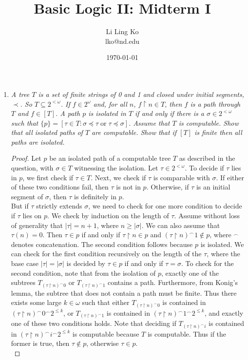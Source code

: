 \documentclass{article}
\begin{document}
\title{Basic Logic II: Midterm I}
\author{Li Ling Ko\\ lko@nd.edu}
\date{\today}
\maketitle

\begin{enumerate}[label={\bf Q\arabic*:}]
  \item \it A tree $T$ is a set of finite strings of 0 and 1 and closed
    under initial segments, $\prec$. So $T\subseteq2^{<\omega}$. If
    $f\in2^\omega$ and, for all $n$, $f\restriction n\in T$, then $f$ is a
    path through $T$ and $f\in[T]$. A path $p$ is isolated in $T$ if and
    only if there is a $\sigma\in2^{<\omega}$ such that $\{p\}=[\tau\in
    T:\sigma\preceq\tau\; \text{or}\; \tau\preceq\sigma]$. Assume that $T$
    is computable. Show that all isolated paths of $T$ are computable. Show
    that if $[T]$ is finite then all paths are isolated.

    \begin{proof}
      Let $p$ be an isolated path of a computable tree $T$ as described in
      the question, with $\sigma\in T$ witnessing the isolation. Let
      $\tau\in2^{<\omega}$. To decide if $\tau$ lies in $p$, we first check
      if $\tau\in T$. Next, we check if $\tau$ is comparable with
      $\sigma$. If either of these two conditions fail, then $\tau$ is not
      in $p$. Otherwise, if $\tau$ is an initial segment of $\sigma$, then
      $\tau$ is definitely in $p$. \\

      But if $\tau$ strictly extends $\sigma$, we need to check for one
      more condition to decide if $\tau$ lies on $p$. We check by induction
      on the length of $\tau$. Assume without loss of generality that
      $|\tau|=n+1$, where $n\geq|\sigma|$. We can also assume that
      $\tau(n)=0$. Then $\tau\in p$ if and only if $\tau\restriction n\in
      p$ and $(\tau\restriction n)^\frown1 \not\in p$, where $^\frown$
      denotes concatenation. The second condition follows because $p$ is
      isolated. We can check for the first condition recursively on the
      length of the $\tau$, where the base case $|\tau|=|\sigma|$ is
      decided by $\tau\in p$ if and only if $\tau=\sigma$. To check for the
      second condition, note that from the isolation of $p$, exactly one of
      the subtrees $T_{(\tau\restriction n)^\frown0}$ or
      $T_{(\tau\restriction n)^\frown1}$ contains a path. Furthermore, from
      Konig's lemma, the subtree that does not contain a path must be
      finite. Thus there exists some large $k\in\omega$ such that either
      $T_{(\tau\restriction n)^\frown0}$ is contained in $(\tau\restriction
      n)^\frown0^\frown 2^{\leq k}$, or $T_{(\tau\restriction n)^\frown1}$
      is contained in $(\tau\restriction n)^\frown1^\frown 2^{\leq k}$, and
      exactly one of these two conditions holds. Note that deciding if
      $T_{(\tau\restriction n)^\frown i}$ is contained in
      $(\tau\restriction n)^\frown i^\frown 2^{\leq k}$ is computable
      because $T$ is computable. Thus if the former is true, then
      $\tau\not\in p$, otherwise $\tau\in p$. \\


\end{proof}
\end{enumerate}
\end{document}
